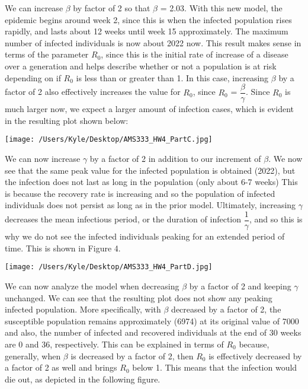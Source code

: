 \documentclass[12pt]{article}
\begin{document}
We can increase ${\beta}$ by factor of 2 so that ${\beta}$ = 2.03. With this new model, the epidemic begins around week 2, since this is when the infected population rises rapidly, and lasts about 12 weeks until week 15 approximately. The maximum number of infected individuals is now about 2022 now. This result makes sense in terms of the parameter $R_0$, since this is the initial rate of increase of a disease over a generation and helps describe whether or not a population is at risk depending on if $R_0$ is less than or greater than 1. In this case, increasing ${\beta}$ by a factor of 2 also effectively increases the value for $R_0$, since $R_0$ = $\dfrac{\beta}{\gamma}$. Since $R_0$ is much larger now, we expect a larger amount of infection cases, which is evident in the resulting plot shown below:
\begin{center}
   \texttt{[image: /Users/Kyle/Desktop/AMS333\_HW4\_PartC.jpg]}
\end{center}


We can now increase ${\gamma}$ by a factor of 2 in addition to our increment of ${\beta}$. We now see that the same peak value for the infected population is obtained (2022), but the infection does not last as long in the population (only about 6-7 weeks) This is because the recovery rate is increasing and so the population of infected individuals does not persist as long as in the prior model. Ultimately, increasing ${\gamma}$ decreases the mean infectious period, or the duration of infection $\dfrac{1}{\gamma}$, and so this is why we do not see the infected individuals peaking for an extended period of time. This is shown in Figure 4.
\begin{center}
   \texttt{[image: /Users/Kyle/Desktop/AMS333\_HW4\_PartD.jpg]}
\end{center}


We can now analyze the model when decreasing ${\beta}$ by a factor of 2 and keeping ${\gamma}$ unchanged. We can see that the resulting plot does not show any peaking infected population. More specifically, with ${\beta}$ decreased by a factor of 2, the susceptible population remains approximately (6974) at its original value of 7000 and also, the number of infected and recovered individuals at the end of 30 weeks are 0 and 36, respectively. This can be explained in terms of $R_0$ because, generally, when ${\beta}$ is decreased by a factor of 2, then $R_0$ is effectively decreased by a factor of 2 as well and brings $R_0$ below 1. This means that the infection would die out, as depicted in the following figure.
\end{document}
